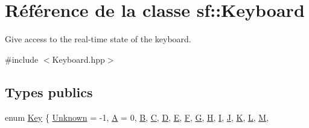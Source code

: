 \hypertarget{classsf_1_1Keyboard}{}\section{Référence de la classe sf\+:\+:Keyboard}
\label{classsf_1_1Keyboard}


Give access to the real-\/time state of the keyboard.  




{\ttfamily \#include $<$Keyboard.\+hpp$>$}

\subsection*{Types publics}
\begin{DoxyCompactItemize}
\item 
enum \hyperlink{classsf_1_1Keyboard_acb4cacd7cc5802dec45724cf3314a142}{Key} \{ \newline
\hyperlink{classsf_1_1Keyboard_acb4cacd7cc5802dec45724cf3314a142a840c43fa8e05ff854f6fe9a86c7c939e}{Unknown} = -\/1, 
\hyperlink{classsf_1_1Keyboard_acb4cacd7cc5802dec45724cf3314a142a9d06fa7ac9af597034ea724fb08b991e}{A} = 0, 
\hyperlink{classsf_1_1Keyboard_acb4cacd7cc5802dec45724cf3314a142aca3142235e5c4199f0b8b45d8368ef94}{B}, 
\hyperlink{classsf_1_1Keyboard_acb4cacd7cc5802dec45724cf3314a142a0d586c4ec0cd6b537cb6f49180fedecc}{C}, 
\newline
\hyperlink{classsf_1_1Keyboard_acb4cacd7cc5802dec45724cf3314a142ae778600bd3e878b59df1dbdd5877ba7a}{D}, 
\hyperlink{classsf_1_1Keyboard_acb4cacd7cc5802dec45724cf3314a142a0e027c08438a8bf77e2e1e5d5d75bd84}{E}, 
\hyperlink{classsf_1_1Keyboard_acb4cacd7cc5802dec45724cf3314a142ab8021fbbe5483bc98f124df6f7090002}{F}, 
\hyperlink{classsf_1_1Keyboard_acb4cacd7cc5802dec45724cf3314a142aafb9e3d7679d88d86afc608d79c251f7}{G}, 
\newline
\hyperlink{classsf_1_1Keyboard_acb4cacd7cc5802dec45724cf3314a142adfa19328304890e17f4a3f4263eed04d}{H}, 
\hyperlink{classsf_1_1Keyboard_acb4cacd7cc5802dec45724cf3314a142abaef09665b4d94ebbed50345cab3981e}{I}, 
\hyperlink{classsf_1_1Keyboard_acb4cacd7cc5802dec45724cf3314a142a948c634009beacdab42c3419253a5e85}{J}, 
\hyperlink{classsf_1_1Keyboard_acb4cacd7cc5802dec45724cf3314a142a25beb62393ff666a4bec18ea2a66f3f2}{K}, 
\newline
\hyperlink{classsf_1_1Keyboard_acb4cacd7cc5802dec45724cf3314a142a5ef1839ffe19b7e9c24f2ca017614ff9}{L}, 
\hyperlink{classsf_1_1Keyboard_acb4cacd7cc5802dec45724cf3314a142a9718de9940f723c956587dcb90450a0a}{M}, 

\end{DoxyCompactItemize}
